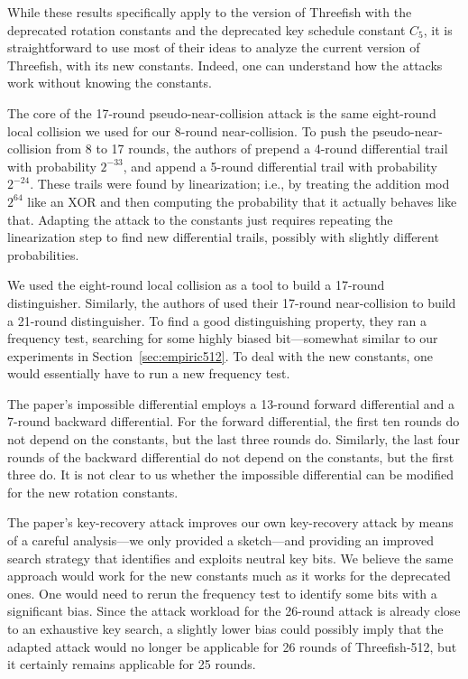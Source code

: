 \documentclass[11pt,twoside]{article}
\begin{document}
While these results specifically apply to the version of Threefish with the deprecated rotation
constants and the deprecated key schedule constant $C_5$, it is straightforward to use most of their ideas to analyze the current version of Threefish, with its new constants.  Indeed, one can understand how the attacks work without knowing the constants. 

The core of the 17-round pseudo-near-collision attack is the same eight-round local collision we used for our 8-round near-collision. To push the pseudo-near-collision from 8 to 17 rounds, the authors of \cite{ACMOPV09} prepend a 4-round differential trail with probability $2^{-33}$, and append a 5-round differential trail with probability $2^{-24}$. These trails were found by linearization; i.e., by treating the addition mod $2^{64}$ like an XOR and then computing the probability that it actually behaves like that. Adapting the attack to the constants just requires repeating the linearization step to find new differential trails, possibly with slightly different probabilities.

We used the eight-round local collision as a tool to build a 17-round distinguisher. Similarly, the authors of \cite{ACMOPV09} used their 17-round near-collision to build a 21-round distinguisher. To find a good distinguishing property, they ran a frequency test, searching for some highly biased bit---somewhat similar to our experiments in Section~\ref{sec:empiric512}. To deal with the new constants, one would essentially have to run a new frequency test. 

The paper's impossible differential employs a 13-round forward differential and a 7-round backward differential. For the forward differential, the first ten rounds do not depend on the constants, but the last three rounds do. Similarly, the last four rounds of the backward differential do not depend on the constants, but the first three do. It is not clear to us whether the impossible differential can be modified for the new rotation constants.

The paper's key-recovery attack improves our own key-recovery attack by means of a careful analysis---we only provided a sketch---and providing an improved search strategy that identifies and exploits neutral key bits. We believe the same approach would work for the new constants much as it works for the deprecated ones. One would need to rerun the frequency test to identify some bits with a significant bias. Since the attack workload for the 26-round attack is already close to an exhaustive key search, a slightly lower bias could possibly imply that the adapted attack would no longer be applicable for 26 rounds of Threefish-512, but it certainly remains applicable for 25 rounds. 
\end{document}
